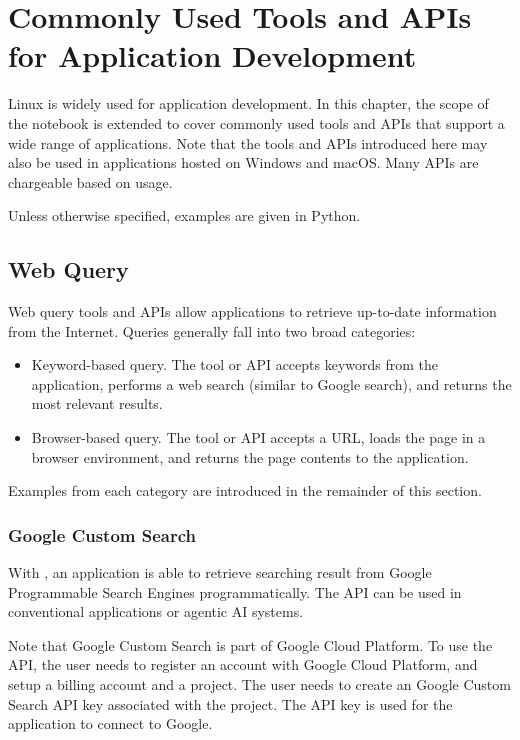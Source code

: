 \chapter{Commonly Used Tools and APIs for Application Development}

Linux is widely used for application development. In this chapter, the scope of the notebook is extended to cover commonly used tools and APIs that support a wide range of applications. Note that the tools and APIs introduced here may also be used in applications hosted on Windows and macOS. Many APIs are chargeable based on usage.

Unless otherwise specified, examples are given in Python.

\section{Web Query}

Web query tools and APIs allow applications to retrieve up-to-date information from the Internet. Queries generally fall into two broad categories:

\begin{itemize}
	\item Keyword-based query. The tool or API accepts keywords from the application, performs a web search (similar to Google search), and returns the most relevant results.
	\item Browser-based query. The tool or API accepts a URL, loads the page in a browser environment, and returns the page contents to the application.
\end{itemize}

Examples from each category are introduced in the remainder of this section.

\subsection{Google Custom Search}

With , an application is able to retrieve searching result from Google Programmable Search Engines programmatically. The API can be used in conventional applications or agentic AI systems. 

Note that Google Custom Search is part of Google Cloud Platform. To use the API, the user needs to register an account with Google Cloud Platform, and setup a billing account and a project. The user needs to create an Google Custom Search API key associated with the project. The API key is used for the application to connect to Google. 

